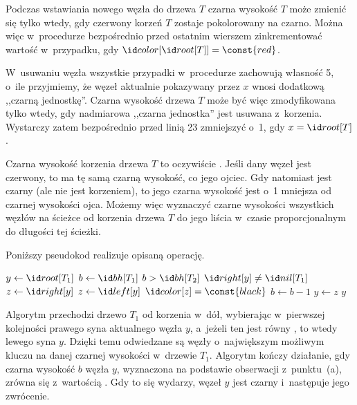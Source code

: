 
\subproblem %
Podczas wstawiania nowego węzła do drzewa $T$ czarna wysokość $T$ może zmienić się tylko wtedy, gdy czerwony korzeń $T$ zostaje pokolorowany na czarno.
Można więc w~procedurze  bezpośrednio przed ostatnim wierszem zinkrementować wartość  w~przypadku, gdy $\attribb{T}{root}{color}=\const{red}$.

W~usuwaniu węzła wszystkie przypadki w~procedurze  zachowują własność 5, o~ile przyjmiemy, że węzeł aktualnie pokazywany przez $x$ wnosi dodatkową ,,czarną jednostkę''.
Czarna wysokość drzewa $T$ może być więc zmodyfikowana tylko wtedy, gdy nadmiarowa ,,czarna jednostka'' jest usuwana z~korzenia.
Wystarczy zatem bezpośrednio przed linią 23 zmniejszyć  o~1, gdy $x=\attrib{T}{root}$.

Czarna wysokość korzenia drzewa $T$ to oczywiście .
Jeśli dany węzeł jest czerwony, to ma tę samą czarną wysokość, co jego ojciec.
Gdy natomiast jest czarny (ale nie jest korzeniem), to jego czarna wysokość jest o~1 mniejsza od czarnej wysokości ojca.
Możemy więc wyznaczyć czarne wysokości wszystkich węzłów na ścieżce od korzenia drzewa $T$ do jego liścia w~czasie proporcjonalnym do długości tej ścieżki.

\subproblem %
Poniższy pseudokod realizuje opisaną operację.
\begin{codebox}
\li	$y\gets\attrib{T_1}{root}$ \label{li:rb-join-point-initial-node}
\li	$b\gets\attrib{T_1}{bh}$
\li	\While $b>\attrib{T_2}{bh}$
\li		\Do \If $\attrib{y}{right}\ne\attrib{T_1}{nil}$ \label{li:rb-join-point-if-begin}
\li				\Then $z\gets\attrib{y}{right}$
\li				\Else $z\gets\attrib{y}{left}$
				\End \label{li:rb-join-point-if-end}
\li			\If $\attrib{z}{color}=\const{black}$
\li				\Then $b\gets b-1$
				\End
\li			$y\gets z$
		\End
\li	\Return $y$
\end{codebox}
Algorytm przechodzi drzewo $T_1$ od korzenia w~dół, wybierając w~pierwszej kolejności prawego syna aktualnego węzła $y$, a~jeżeli ten jest równy , to wtedy lewego syna $y$.
Dzięki temu odwiedzane są węzły o~największym możliwym kluczu na danej czarnej wysokości w~drzewie $T_1$.
Algorytm kończy działanie, gdy czarna wysokość $b$ węzła $y$, wyznaczona na podstawie obserwacji z~punktu~(a), zrówna się z~wartością .
Gdy to się wydarzy, węzeł $y$ jest czarny i~następuje jego zwrócenie.

